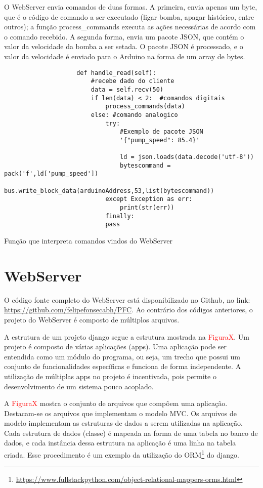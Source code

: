 				O WebServer envia comandos de duas formas. A primeira, envia apenas um byte, que é o código de comando a ser executado (ligar bomba, apagar histórico, entre outros); a função process\_commands executa as ações necessárias de acordo com o comando recebido. A segunda forma, envia um pacote JSON, que contém o valor da velocidade da bomba a ser setada. O pacote JSON é processado, e o valor da velocidade é enviado para o Arduino na forma de um array de bytes.
				
				\begin{listing}[!htb]
					\begin{verbatim}
					def handle_read(self):
						#recebe dado do cliente
						data = self.recv(50)
						if len(data) < 2:  #comandos digitais
							process_commands(data)
						else: #comando analogico
							try:
								#Exemplo de pacote JSON
								'{"pump_speed": 85.4}'
								
								ld = json.loads(data.decode('utf-8'))
								bytescommand = pack('f',ld['pump_speed'])
								bus.write_block_data(arduinoAddress,53,list(bytescommand))
							except Exception as err:
								print(str(err))
							finally:
							pass
					\end{verbatim}
					\caption{Função que interpreta comandos vindos do WebServer}
					\label{cod:handle_read}
				\end{listing}
			
			\section{WebServer}
				O código fonte completo do WebServer está disponibilizado no Github, no link: \url{https://github.com/felipefonsecabh/PFC}. Ao contrário dos códigos anteriores, o projeto do WebServer é composto de múltiplos arquivos.
				
				A estrutura de um projeto django segue a estrutura mostrada na \textcolor{red}{FiguraX}. Um projeto é composto de várias aplicações (apps). Uma aplicação pode ser entendida como um módulo do programa, ou seja, um trecho que possui um conjunto de funcionalidades específicas e funciona de forma independente. A utilização de múltiplas apps no projeto é incentivada, pois permite o desenvolvimento de um sistema pouco acoplado.
				
				A \textcolor{red}{FiguraX} mostra o conjunto de arquivos que compõem uma aplicação. Destacam-se os arquivos que implementam o modelo MVC. Os arquivos de modelo implementam as estruturas de dados a serem utilizadas na aplicação. Cada estrutura de dados (classe) é mapeada na forma de uma tabela no banco de dados, e cada instância dessa estrutura na aplicação é uma linha na tabela criada. Esse procedimento é um exemplo da utilização do ORM\footnote{\url{https://www.fullstackpython.com/object-relational-mappers-orms.html}} do django.
				
